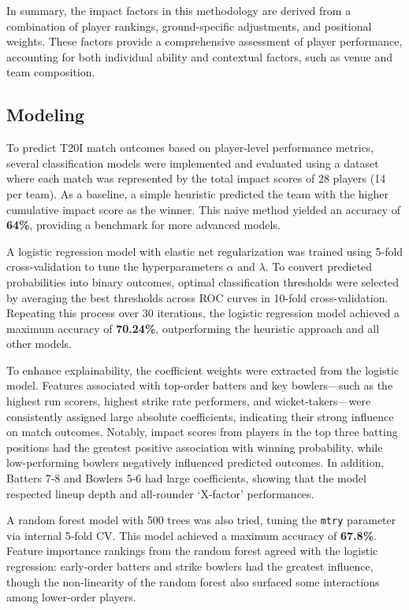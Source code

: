 \documentclass{article}[12pt]
\begin{document}
In summary, the impact factors in this methodology are derived from a combination of player rankings, ground-specific adjustments, and positional weights. These factors provide a comprehensive assessment of player performance, accounting for both individual ability and contextual factors, such as venue and team composition.

\subsection{Modeling}

To predict T20I match outcomes based on player-level performance metrics, several classification models were implemented and evaluated using a dataset where each match was represented by the total impact scores of 28 players (14 per team). As a baseline, a simple heuristic predicted the team with the higher cumulative impact score as the winner. This naive method yielded an accuracy of \textbf{64\%}, providing a benchmark for more advanced models.

A logistic regression model with elastic net regularization was trained using 5-fold cross-validation to tune the hyperparameters $\alpha$ and $\lambda$. \parencite{glmnet} To convert predicted probabilities into binary outcomes, optimal classification thresholds were selected by averaging the best thresholds across ROC curves in 10-fold cross-validation. \parencite{pROC_package} Repeating this process over 30 iterations, the logistic regression model achieved a maximum accuracy of \textbf{70.24\%}, outperforming the heuristic approach and all other models.

To enhance explainability, the coefficient weights were extracted from the logistic model. Features associated with top-order batters and key bowlers—such as the highest run scorers, highest strike rate performers, and wicket-takers—were consistently assigned large absolute coefficients, indicating their strong influence on match outcomes. Notably, impact scores from players in the top three batting positions had the greatest positive association with winning probability, while low-performing bowlers negatively influenced predicted outcomes. In addition, Batters 7-8 and Bowlers 5-6 had large coefficients, showing that the model respected lineup depth and all-rounder `X-factor' performances.

A random forest model with 500 trees was also tried, tuning the \texttt{mtry} parameter via internal 5-fold CV. This model achieved a maximum accuracy of \textbf{67.8\%}. Feature importance rankings from the random forest agreed with the logistic regression: early-order batters and strike bowlers had the greatest influence, though the non-linearity of the random forest also surfaced some interactions among lower-order players.
\end{document}
